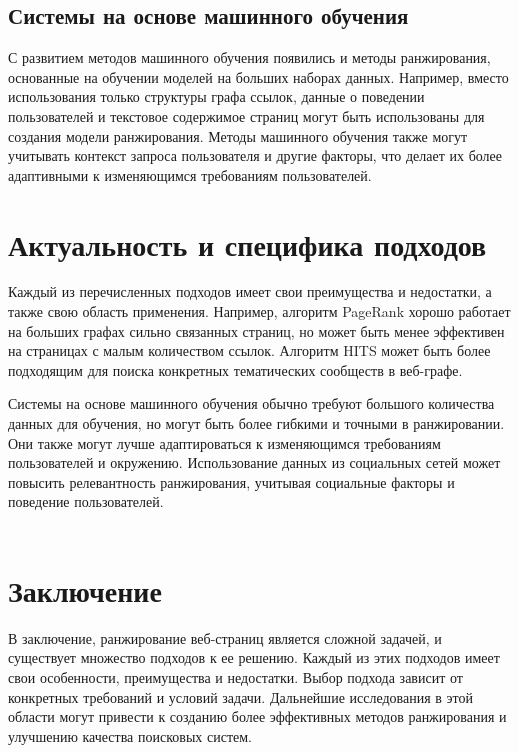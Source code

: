 \documentclass[a4paper]{article}
\begin{document}
	\subsection{Системы на основе машинного обучения}
	
	С развитием методов машинного обучения появились и методы ранжирования, основанные на обучении моделей на больших наборах данных. Например, вместо использования только структуры графа ссылок, данные о поведении пользователей и текстовое содержимое страниц могут быть использованы для создания модели ранжирования. Методы машинного обучения также могут учитывать контекст запроса пользователя и другие факторы, что делает их более адаптивными к изменяющимся требованиям пользователей.
	\newpage
	\section{Актуальность и специфика подходов}
	
	Каждый из перечисленных подходов имеет свои преимущества и недостатки, а также свою область применения. Например, алгоритм PageRank хорошо работает на больших графах сильно связанных страниц, но может быть менее эффективен на страницах с малым количеством ссылок. Алгоритм HITS может быть более подходящим для поиска конкретных тематических сообществ в веб-графе.
	
	Системы на основе машинного обучения обычно требуют большого количества данных для обучения, но могут быть более гибкими и точными в ранжировании. Они также могут лучше адаптироваться к изменяющимся требованиям пользователей и окружению. Использование данных из социальных сетей может повысить релевантность ранжирования, учитывая социальные факторы и поведение пользователей.
	\\
	\\
	\section{Заключение}
	
	В заключение, ранжирование веб-страниц является сложной задачей, и существует множество подходов к ее решению. Каждый из этих подходов имеет свои особенности, преимущества и недостатки. Выбор подхода зависит от конкретных требований и условий задачи. Дальнейшие исследования в этой области могут привести к созданию более эффективных методов ранжирования и улучшению качества поисковых систем.

\newpage
\end{document}
